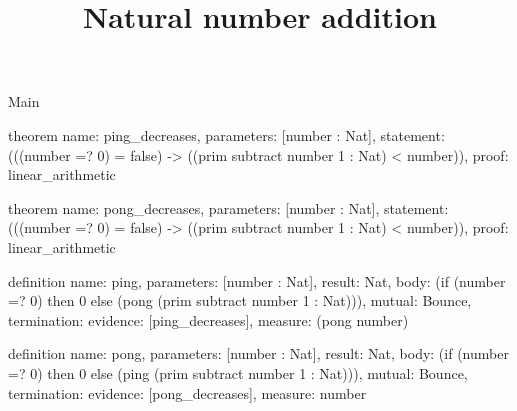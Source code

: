 \begin{lexlean}{Main}
\title{Natural number addition}
\begin{semanticmodule}
theorem{
  name: ping_decreases,
  parameters: [number : Nat],
  statement: (((number =? 0) = false) -> ((prim subtract number 1 : Nat) < number)),
  proof: linear_arithmetic{}
}

theorem{
  name: pong_decreases,
  parameters: [number : Nat],
  statement: (((number =? 0) = false) -> ((prim subtract number 1 : Nat) < number)),
  proof: linear_arithmetic{}
}

definition{
  name: ping,
  parameters: [number : Nat],
  result: Nat,
  body: (if (number =? 0) then 0 else (pong (prim subtract number 1 : Nat))),
  mutual: Bounce,
  termination: {evidence: [ping_decreases], measure: (pong number)}
}

definition{
  name: pong,
  parameters: [number : Nat],
  result: Nat,
  body: (if (number =? 0) then 0 else (ping (prim subtract number 1 : Nat))),
  mutual: Bounce,
  termination: {evidence: [pong_decreases], measure: number}
}
\end{semanticmodule}
\end{lexlean}
